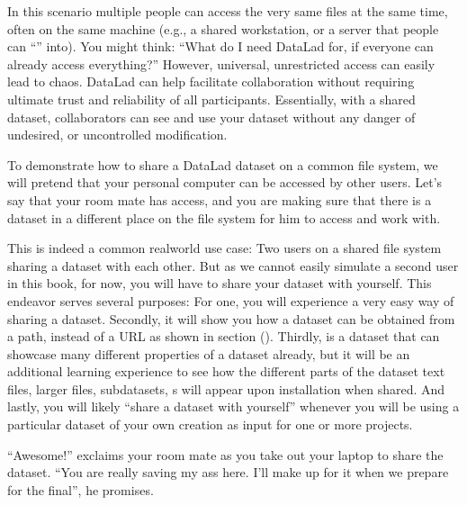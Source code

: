 \sphinxAtStartPar
In this scenario multiple people can access the very same files at the
same time, often on the same machine (e.g., a shared workstation, or
a server that people can “{\hyperref[\detokenize{glossary:term-SSH}]{}}” into). You might think: “What do I need
DataLad for, if everyone can already access everything?” However,
universal, unrestricted access can easily lead to chaos. DataLad can
help facilitate collaboration without requiring ultimate trust and
reliability of all participants. Essentially, with a shared dataset,
collaborators can see and use your dataset without any danger
of undesired, or uncontrolled modification.

\sphinxAtStartPar
To demonstrate how to share a DataLad dataset on a common file system,
we will pretend that your personal computer
can be accessed by other users. Let’s say that
your room mate has access, and you are making sure that there is
a  dataset in a different place on the file system
for him to access and work with.

\sphinxAtStartPar
This is indeed a common real\sphinxhyphen{}world use case: Two users on a shared
file system sharing a dataset with each other.
But as we cannot easily simulate a second user in this book,
for now, you will have to share your dataset with yourself.
This endeavor serves several purposes: For one, you will experience a very easy
way of sharing a dataset. Secondly, it will show you
how a dataset can be obtained from a path, instead of a URL as shown in section
{\hyperref[\detokenize{basics/101-105-install:installds}]{}} (). Thirdly,  is a dataset that can
showcase many different properties of a dataset already, but it will
be an additional learning experience to see how the different parts
of the dataset \textendash{} text files, larger files, subdatasets,
{\hyperref[\detokenize{glossary:term-run-record}]{}}s \textendash{} will appear upon installation when shared.
And lastly, you will likely “share a dataset with yourself” whenever you
will be using a particular dataset of your own creation as input for
one or more projects.

\sphinxAtStartPar
“Awesome!” exclaims your room mate as you take out your laptop to
share the dataset. “You are really saving my ass
here. I’ll make up for it when we prepare for the final”, he promises.


